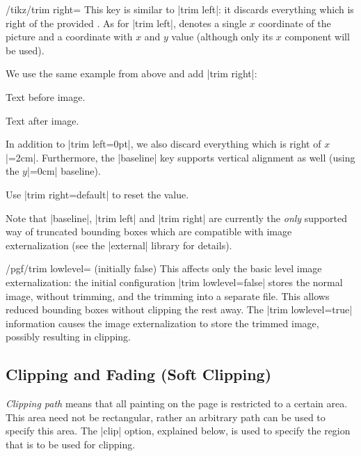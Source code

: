 \begin{key}{/tikz/trim right=}
	This key is similar to |trim left|: it discards everything which is right of the provided . As for |trim left|,  denotes a single $x$ coordinate of the picture and  a coordinate with $x$ and $y$ value (although only its $x$ component will be used).

	We use the same example from above and add |trim right|:
\begin{codeexample}[]
Text before image.%
	\begin{tikzpicture}[trim left, trim right=2cm, baseline]
		\draw (-1,-1) grid (3,2);
		\fill (0,0) circle (5pt);
	\end{tikzpicture}%
Text after image.
\end{codeexample}
	In addition to |trim left=0pt|, we also discard everything which is right of $x$|=2cm|. Furthermore, the |baseline| key supports vertical alignment as well (using the $y$|=0cm| baseline).

	Use |trim right=default| to reset the value.
\end{key}

Note that |baseline|, |trim left| and |trim right| are currently the \emph{only} supported way of truncated bounding boxes which are compatible with image externalization (see the |external| library for details).

\begin{key}{/pgf/trim lowlevel= (initially false)}
	This affects only the basic level image externalization: the initial configuration |trim lowlevel=false| stores the normal image, without trimming, and the trimming into a separate file. This allows reduced bounding boxes without clipping the rest away. The |trim lowlevel=true| information causes the image externalization to store the trimmed image, possibly resulting in clipping.
\end{key}

\subsection{Clipping and Fading (Soft Clipping)}

\emph{Clipping path} means that all painting on the page is restricted
to a certain area. This area need not be rectangular, rather an
arbitrary path can be used to specify this area. The |clip| option,
explained below, is used to specify the region that is to be used for
clipping.

